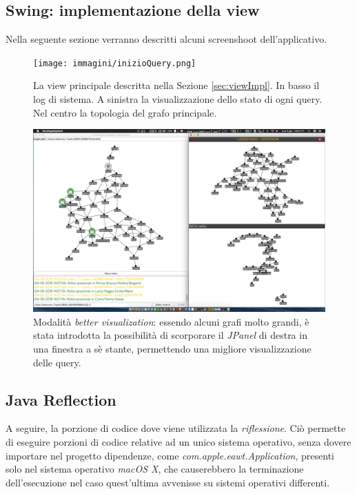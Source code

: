\subsection{Swing: implementazione della view}
\label{sec:view}
Nella seguente sezione verranno descritti alcuni screenshoot dell'applicativo.
\begin{figure}
\hspace{-2.5cm}
\texttt{[image: immagini/inizioQuery.png]}
\caption{La view principale descritta nella Sezione \ref{sec:viewImpl}.
In basso il log di sistema. A sinistra la visualizzazione dello stato di ogni query.
Nel centro la topologia del grafo principale.}
\end{figure}
\begin{figure}
	\hspace{-2.5cm}
	\includegraphics[scale=0.3]{immagini/betterVisualization.png}
	\caption{Modalità \emph{better visualization}: essendo alcuni grafi molto grandi, è stata introdotta la possibilità di scorporare il \emph{JPanel} di destra in una finestra a sè stante, permettendo una migliore visualizzazione delle query.}
\end{figure}
\newpage
\subsection{Java Reflection}
\label{sec:javaReflection}
A seguire, la porzione di codice dove viene utilizzata la \emph{riflessione}. Ciò permette di eseguire
porzioni di codice relative ad un unico sistema operativo, senza dovere importare nel progetto
dipendenze, come \emph{com.apple.eawt.Application}, presenti solo nel sistema operativo \emph{macOS X}, che
causerebbero la terminazione dell'esecuzione nel caso quest'ultima avvenisse su sistemi operativi differenti.\\

